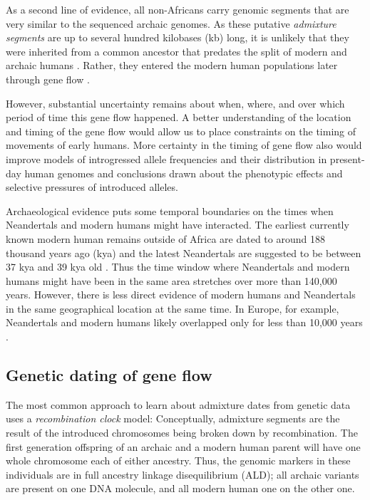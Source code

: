 \documentclass[11pt]{article}
\let\oldparagraph\paragraph
\renewcommand{\paragraph}[1]{\oldparagraph{#1}\mbox{}}
\begin{document}
As a second line of evidence, all non-Africans carry genomic segments that are very similar to the sequenced archaic genomes. As these putative \emph{admixture segments} are up to several hundred kilobases (kb) long, it is unlikely that they were inherited from a common ancestor that predates the split of modern and archaic humans \citep{sankararaman_genomic_2014, vernot_resurrecting_2014}. Rather, they entered the modern human populations later through gene flow \citep{sankararaman_date_2012,sankararaman_genomic_2014, vernot_resurrecting_2014, sankararaman_combined_2016,vernot_excavating_2016}. 


However, substantial uncertainty remains about when, where, and over which period of time this gene flow happened. A better understanding of the location and timing of the gene flow would allow us to place constraints on the timing of movements of early humans. More certainty in the timing of gene flow also would improve models of introgressed allele frequencies and their distribution in present-day human genomes and conclusions drawn about the phenotypic effects and selective pressures of introduced alleles.

 
Archaeological evidence puts some temporal boundaries on the times when Neandertals and modern humans might have interacted. The earliest currently known modern human remains outside of Africa are dated to around 188 thousand years ago (kya)  \citep{hershkovitz_earliest_2018,stringer_when_2018} and the latest Neandertals are suggested to be between 37 kya and 39 kya old \citep{higham_timing_2014,zilhao_precise_2017}. Thus the time window where Neandertals and modern humans might have been in the same area stretches over more than 140,000 years. However, there is less direct evidence of modern humans and Neandertals in the same geographical location at the same time. In Europe, for example, Neandertals and modern humans likely overlapped only for less than 10,000 years \citep{bard_extended_2020}. 

\subsection{Genetic dating of gene flow}\label{Admixture models}

The most common approach to learn about admixture dates from genetic data uses a \emph{recombination clock} model: Conceptually, admixture segments are the result of the introduced chromosomes being broken down by recombination. The first generation offspring of an archaic and a modern human parent will have one whole chromosome each of either ancestry. Thus, the genomic  markers in these individuals are in full ancestry linkage disequilibrium (ALD); all archaic variants are present on one DNA molecule, and all modern human one on the other one.
\end{document}
